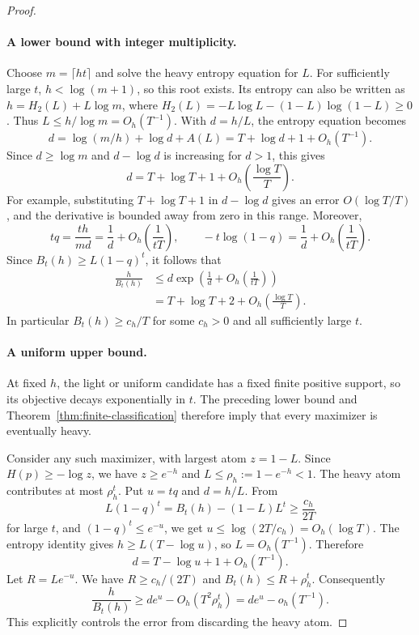 \documentclass[11pt]{article}
\numberwithin{equation}{section}
\begin{document}
\begin{proof}
\paragraph{A lower bound with integer multiplicity.}
Choose $m=\lceil ht\rceil$ and solve the heavy entropy equation for $L$.
For sufficiently large $t$, $h<\log(m+1)$, so this root exists. Its entropy
can also be written as $h=H_2(L)+L\log m$, where
$H_2(L)=-L\log L-(1-L)\log(1-L)\ge0$. Thus
$L\le h/\log m=O_h(T^{-1})$. With $d=h/L$, the entropy equation becomes
\[
 d=\log(m/h)+\log d+A(L)
  =T+\log d+1+O_h(T^{-1}).
\]
Since $d\ge\log m$ and $d-\log d$ is increasing for $d>1$, this gives
\begin{equation}\label{eq:d-lower-candidate}
 d=T+\log T+1+O_h\!\left(\frac{\log T}{T}\right).
\end{equation}
For example, substituting $T+\log T+1$ in $d-\log d$ gives an error
$O(\log T/T)$, and the derivative is bounded away from zero in this range.
Moreover,
\[
 tq=\frac{th}{md}=\frac1d+O_h\!\left(\frac1{tT}\right),
 \qquad
 -t\log(1-q)=\frac1d+O_h\!\left(\frac1{tT}\right).
\]
Since $B_t(h)\ge L(1-q)^t$, it follows that
\begin{equation}\label{eq:reciprocal-upper}
 \begin{aligned}
 \frac h{B_t(h)}
 &\le d\exp\!\left(\frac1d+O_h\!\left(\frac1{tT}\right)\right)\\
 &=T+\log T+2+O_h\!\left(\frac{\log T}{T}\right).
 \end{aligned}
\end{equation}
In particular $B_t(h)\ge c_h/T$ for some $c_h>0$ and all sufficiently
large $t$.

\paragraph{A uniform upper bound.}
At fixed $h$, the light or uniform candidate has a fixed finite positive
support, so its objective decays exponentially in $t$. The preceding
lower bound and Theorem~\ref{thm:finite-classification} therefore imply
that every maximizer is eventually heavy.

Consider any such maximizer, with largest atom $z=1-L$. Since
$H(p)\ge-\log z$, we have $z\ge e^{-h}$ and
$L\le\rho_h:=1-e^{-h}<1$. The heavy atom contributes at most $\rho_h^t$.
Put $u=tq$ and $d=h/L$. From
\[
 L(1-q)^t=B_t(h)-(1-L)L^t\ge\frac{c_h}{2T}
\]
for large $t$, and $(1-q)^t\le e^{-u}$, we get
$u\le\log(2T/c_h)=O_h(\log T)$. The entropy identity gives
$h\ge L(T-\log u)$, so $L=O_h(T^{-1})$. Therefore
\begin{equation}\label{eq:optimizer-d}
 d=T-\log u+1+O_h(T^{-1}).
\end{equation}
Let $R=Le^{-u}$. We have $R\ge c_h/(2T)$ and
$B_t(h)\le R+\rho_h^t$. Consequently
\begin{equation}\label{eq:reciprocal-uniform}
 \frac h{B_t(h)}
 \ge de^u-O_h(T^2\rho_h^t)
 =de^u-o_h(T^{-1}).
\end{equation}
This explicitly controls the error from discarding the heavy atom.


\end{proof}
\end{document}

